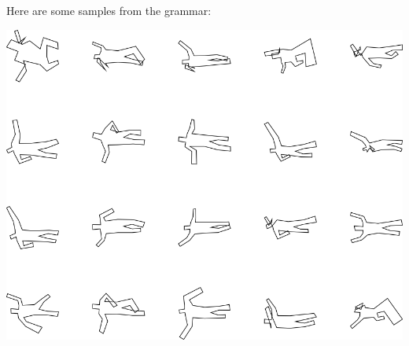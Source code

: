 Here are some samples from the grammar:

\includegraphics[width=6in]{output/3.learning/sdf_tuning/gram.5.d/samples.png}

